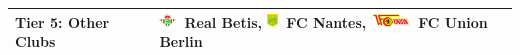 \documentclass[t,aspectratio=169,xcolor=dvipsnames]{beamer}
\begin{document}
\begin{frame}
{\begin{tabular}{|l|l|}
\hline
\textbf{Tier 5: Other Clubs} & 
\includegraphics[height=1em]{badges/betis.png}~Real Betis, 
\includegraphics[height=1em]{badges/nantes.png}~FC Nantes, 
\includegraphics[height=1em]{badges/union_berlin.png}~FC Union Berlin \\
\hline
\end{tabular}
}

\end{frame}

\end{document}
